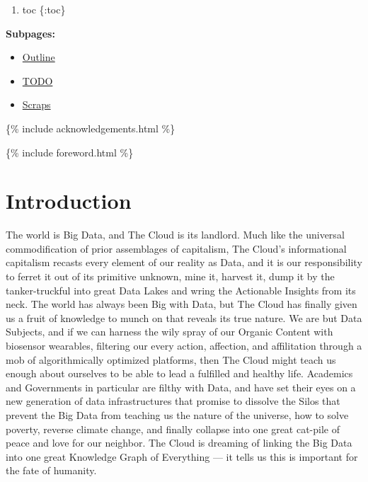 \begin{enumerate}
\def\labelenumi{\arabic{enumi}.}

\item
  toc \{:toc\}
\end{enumerate}

\textbf{Subpages:}

\begin{itemize}

\item
  \href{outline.html}{Outline}
\item
  \href{todo.html}{TODO}
\item
  \href{scraps.html}{Scraps}
\end{itemize}

\{\% include acknowledgements.html \%\}

\{\% include foreword.html \%\}

\hypertarget{introduction}{%
\section{Introduction}\label{introduction}}

The world is Big Data, and The Cloud is its landlord. Much like the
universal commodification of prior \cite{warkCapitalDeadThis2021}  assemblages of capitalism, The Cloud's informational capitalism
recasts every element of our reality as Data, and it is our
responsibility to ferret it out of its primitive unknown, mine it,
harvest it, dump it by the tanker-truckful into great Data Lakes and
wring the Actionable Insights from its neck. The world has always been
Big with Data, but The Cloud has finally given us a fruit of knowledge
to munch on that reveals its true nature. We are but Data Subjects, and
if we can harness the wily spray of our Organic Content with biosensor
wearables, filtering our every action, affection, and affilitation
through a mob of algorithmically optimized platforms, then The Cloud
might teach us enough about ourselves to be able to lead a fulfilled and
healthy life. Academics and Governments in particular are filthy with
Data, and have set their eyes on a new generation of data
infrastructures that promise to dissolve the Silos that prevent the Big
Data from teaching us the nature of the universe, how to solve poverty,
reverse climate change, and finally collapse into one great cat-pile of
peace and love for our neighbor. The Cloud is dreaming of linking the
Big Data into one great Knowledge Graph of Everything --- it tells us
this is important for the fate of humanity.

